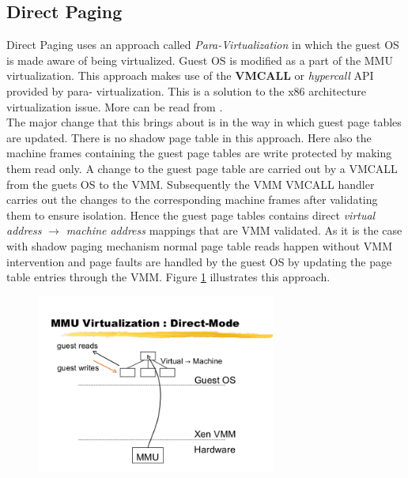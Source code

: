 \subsection{Direct Paging} \label{para}
Direct Paging uses an approach called \textit{Para-Virtualization} in which the guest OS
is made aware of being virtualized. Guest OS is modified as a part of the MMU virtualization. This
approach makes use of the \textbf{VMCALL} or \textit{hypercall} API provided by para-
virtualization. This is a solution to the x86 architecture virtualization issue. More
can be read from \citet{force2000analysis}.\\
The major change that this brings about is in the way in which guest page tables are updated.
There is no shadow page table in this approach. Here also the machine frames containing the guest
page tables are write protected by making them read only. A change to the guest page table are carried out by a VMCALL from the guets OS to the VMM. Subsequently the VMM VMCALL handler carries out the changes to the corresponding machine frames after validating them to ensure isolation. Hence the guest page tables contains direct \textit{virtual address} $\rightarrow$ \textit {machine address} mappings that are VMM validated. As it is the case with shadow paging mechanism normal page table reads happen without VMM intervention and page faults are handled by the guest OS by updating the page table entries through the VMM. Figure \ref{fig:para} illustrates this approach.
\begin{figure}[tbp]
  \begin{center}
    \includegraphics[width=0.7\textwidth]{images/paravirt}
    \label{fig:para}
     \end{center}
\end{figure}
